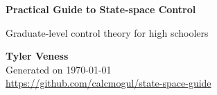 \begin{titlepage}
  \begin{center}
    \vspace*{1cm}

    \Huge
    \textbf{Practical Guide to State-space Control}

    \vspace{0.5cm}
    \LARGE
    Graduate-level control theory for high schoolers

    \vspace{1.5cm}

    \textbf{Tyler Veness} \\

    \vspace{1.5cm}
    \normalsize
    Generated on \monthdayyeardate\today \\
    \url{https://github.com/calcmogul/state-space-guide}

    \vfill
  \end{center}
\end{titlepage}
\thispagestyle{empty}  %

\renewcommand\contentsname{Table of Contents}
\tableofcontents
\listoffigures
\listoftables
\listofsnippets
\clearpage
